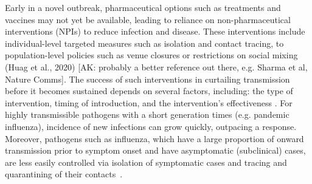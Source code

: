 \documentclass{article}
\begin{document}

Early in a novel outbreak, pharmaceutical options such as treatments and vaccines may not yet be available, leading to reliance on non-pharmaceutical interventions (NPIs) to reduce infection and disease. These interventions include individual-level targeted measures such as isolation and contact tracing, to population-level policies such as venue closures or restrictions on social mixing (Huag et al., 2020) [AK: probably a better reference out there, e.g. Sharma et al, Nature Comms]. The success of such interventions in curtailing transmission before it becomes sustained depends on several factors, including: the type of intervention, timing of introduction, and the intervention's effectiveness \citep{longiniContainingPandemicInfluenza2005}. For highly transmissible pathogens with a short generation times (e.g. pandemic influenza), incidence of new infections can grow quickly, outpacing a response. Moreover, pathogens such as influenza, which have a large proportion of onward transmission prior to symptom onset and have asymptomatic (subclinical) cases, are less easily controlled via isolation of symptomatic cases and tracing and quarantining of their contacts~\citep{fraserFactorsThatMake2004}. 
\end{document}
